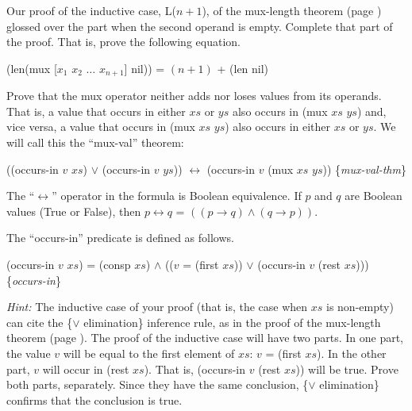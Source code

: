 \begin{ExerciseList}
\Exercise
Our proof of the inductive case, L($n+1$), of the mux-length theorem
(page \pageref{mux-length-thm-induc-case})
glossed over the part when the second operand is empty.
Complete that part of the proof. That is, prove the following equation.

\hspace{1cm} (len(mux [$x_1$ $x_2$ $\dots$ $x_{n+1}$] nil)) = $(n+1)$ + (len nil)

\Exercise [label={ex:mul-val-thm}]
Prove that the mux operator neither adds nor loses values from its operands.
That is, a value that occurs in either $xs$ or $ys$ also occurs in (mux $xs$ $ys$)
and, vice versa, a value that occurs in (mux $xs$ $ys$) also occurs in either $xs$ or $ys$.
We will call this the ``mux-val'' theorem:

\label{thm:mux-val}
\hspace{1cm} ((occurs-in $v$ $xs$) $\vee$ (occurs-in $v$ $ys$)) $\leftrightarrow$ (occurs-in $v$ (mux $xs$ $ys$)) \hfill \{\emph{mux-val-thm}\}

\label{def:equivalence-op}
The ``$\leftrightarrow$'' operator in the formula is Boolean equivalence.
If $p$ and $q$ are Boolean values (True or False),
then $p \leftrightarrow q$ = $((p \rightarrow q) \wedge (q \rightarrow p))$.

The ``occurs-in'' predicate is defined as follows.

\label{def:occurs-in}
\hspace{1cm} (occurs-in $v$ $xs$) = (consp $xs$) $\wedge$ (($v$ = (first $xs$)) $\vee$ (occurs-in $v$ (rest $xs$)))
\hfill \{\emph{occurs-in}\}

\emph{Hint:} The inductive case of your proof
(that is, the case when $xs$ is non-empty)
can cite the \{$\vee$ elimination\} inference rule,
as in the proof of the mux-length theorem (page \pageref{mux-length-thm}).
The proof of the inductive case will have two parts.
In one part, the value $v$ will be equal to
the first element of $xs$:
$v$ = (first $xs$).
In the other part, $v$ will occur in (rest $xs$).
That is, (occurs-in $v$ (rest $xs$)) will be true.
Prove both parts, separately.
Since they have the same conclusion,
\{$\vee$ elimination\} confirms that the conclusion is true.
\end{ExerciseList}

